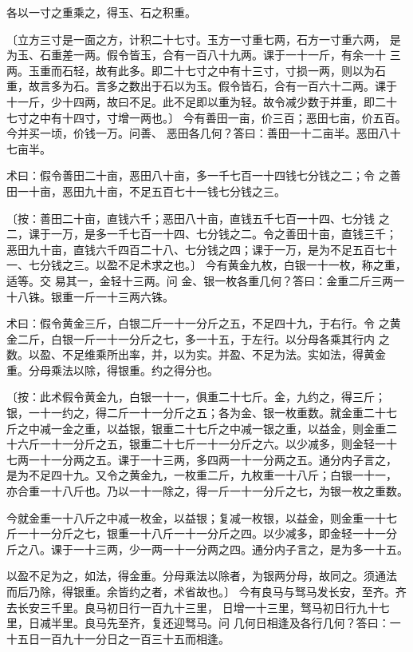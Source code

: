 \documentclass[a4paper,12pt,UTF8,twoside]{ctexbook}
\begin{document}
各以一寸之重乘之，得玉、石之积重。

〔立方三寸是一面之方，计积二十七寸。玉方一寸重七两，石方一寸重六两， 是为玉、石重差一两。假令皆玉，合有一百八十九两。课于一十一斤，有余一十 三两。玉重而石轻，故有此多。即二十七寸之中有十三寸，寸损一两，则以为石 重，故言多为石。言多之数出于石以为玉。假令皆石，合有一百六十二两。课于 十一斤，少十四两，故曰不足。此不足即以重为轻。故令减少数于并重，即二十 七寸之中有十四寸，寸增一两也。〕 今有善田一亩，价三百；恶田七亩，价五百。今并买一顷，价钱一万。问善、 恶田各几何？答曰：善田一十二亩半。恶田八十七亩半。

术曰：假令善田二十亩，恶田八十亩，多一千七百一十四钱七分钱之二；令 之善田一十亩，恶田九十亩，不足五百七十一钱七分钱之三。

〔按：善田二十亩，直钱六千；恶田八十亩，直钱五千七百一十四、七分钱 之二，课于一万，是多一千七百一十四、七分钱之二。令之善田十亩，直钱三千； 恶田九十亩，直钱六千四百二十八、七分钱之四；课于一万，是为不足五百七十 一、七分钱之三。以盈不足术求之也。〕 今有黄金九枚，白银一十一枚，称之重，适等。交 易其一，金轻十三两。问 金、银一枚各重几何？答曰：金重二斤三两一十八铢。银重一斤一十三两六铢。

术曰：假令黄金三斤，白银二斤一十一分斤之五，不足四十九，于右行。令 之黄金二斤，白银一斤一十一分斤之七，多一十五，于左行。以分母各乘其行内 之数。以盈、不足维乘所出率，并，以为实。并盈、不足为法。实如法，得黄金 重。分母乘法以除，得银重。约之得分也。

〔按：此术假令黄金九，白银一十一，俱重二十七斤。金，九约之，得三斤； 银，一十一约之，得二斤一十一分斤之五；各为金、银一枚重数。就金重二十七 斤之中减一金之重，以益银，银重二十七斤之中减一银之重，以益金，则金重二 十六斤一十一分斤之五，银重二十七斤一十一分斤之六。以少减多，则金轻一十 七两一十一分两之五。课于一十三两，多四两一十一分两之五。通分内子言之， 是为不足四十九。又令之黄金九，一枚重二斤，九枚重一十八斤；白银一十一， 亦合重一十八斤也。乃以一十一除之，得一斤一十一分斤之七，为银一枚之重数。

今就金重一十八斤之中减一枚金，以益银；复减一枚银，以益金，则金重一十七 斤一十一分斤之七，银重一十八斤一十一分斤之四。以少减多，即金轻一十一分 斤之八。课于一十三两，少一两一十一分两之四。通分内子言之，是为多一十五。

以盈不足为之，如法，得金重。分母乘法以除者，为银两分母，故同之。须通法 而后乃除，得银重。余皆约之者，术省故也。〕 今有良马与驽马发长安，至齐。齐去长安三千里。良马初日行一百九十三里， 日增一十三里，驽马初日行九十七里，日减半里。良马先至齐，复还迎驽马。问 几何日相逢及各行几何？答曰：一十五日一百九十一分日之一百三十五而相逢。
\end{document}
